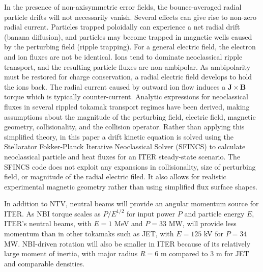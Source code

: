 \documentclass[aip, pop, preprint]{revtex4-1}
\numberwithin{figure}{section}
\numberwithin{equation}{section}
\begin{document}
In the presence of non-axisymmetric error fields, the bounce-averaged radial particle drifts will not necessarily vanish. Several effects can give rise to non-zero radial current. Particles trapped poloidally can experience a net radial drift (banana diffusion), and particles may become trapped in magnetic wells caused by the perturbing field (ripple trapping). For a general electric field, the electron and ion fluxes are not be identical. Ions tend to dominate neoclassical ripple transport, and the resulting particle fluxes are non-ambipolar. As ambipolarity must be restored for charge conservation, a radial electric field develops to hold the ions back. The radial current caused by outward ion flow induces a $\bm{J} \times \bm{B}$ torque which is typically counter-current. Analytic expressions for neoclassical fluxes in several rippled tokamak transport regimes have been derived, making assumptions about the magnitude of the perturbing field, electric field, magnetic geometry, collisionality, and the collision operator.\cite{Shaing2003, Shaing2008, Shaing2009, Shaing2010} Rather than applying this simplified theory, in this paper a drift kinetic equation is solved using the Stellarator Fokker-Planck Iterative Neoclassical Solver (SFINCS) \cite{Landreman2014} to calculate neoclassical particle and heat fluxes for an ITER steady-state scenario. The SFINCS code does not exploit any expansions in collisionality, size of perturbing field, or magnitude of the radial electric filed. It also allows for realistic experimental magnetic geometry rather than using simplified flux surface shapes. 

In addition to NTV, neutral beams will provide an angular momentum source for ITER. As NBI torque scales as $P/E^{1/2}$ for input power $P$ and particle energy $E$, ITER's neutral beams, with $E = 1$ MeV and $P = 33$ MW, will provide less momentum than in other tokamaks such as JET, with $E = 125$ kV for $P = 34$ MW.\cite{Ciric2011} NBI-driven rotation will also be smaller in ITER because of its relatively large moment of inertia, with major radius $R = 6$ m compared to 3 m for JET and comparable densities. 
\end{document}
